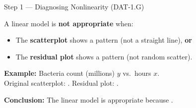 \documentclass[10pt]{article}
\begin{document}
\vspace{0.1in}

\begin{notesbox}{Step 1 --- Diagnosing Nonlinearity (DAT-1.G)}
\small

\noindent A linear model is \textbf{not appropriate} when:
\begin{itemize}[itemsep=2pt]
  \item The \textbf{scatterplot} shows a  pattern (not a straight line), \textbf{or}
  \item The \textbf{residual plot} shows a  pattern (not random scatter).
\end{itemize}

\vspace{6pt}
\textbf{Example:} Bacteria count (millions) $y$ vs.\ hours $x$. \\[4pt]
\noindent Original scatterplot: .
Residual plot: .

\vspace{6pt}
\textbf{Conclusion:} The linear model is  appropriate because .

\end{notesbox}

\vspace{0.1in}
\end{document}
